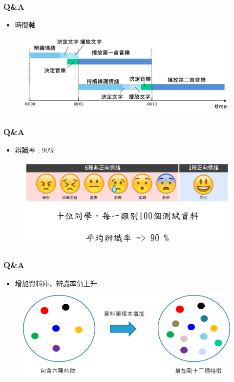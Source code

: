 \documentclass[10pt, conference, compsocconf]{beamer}
\begin{document}
\begin{CJK}{UTF8}{}
\begin{frame}
\frametitle{Q\&A}
\begin{itemize}
\item\Large 時間軸
\end{itemize}
\begin{figure}[t]
\begin{center}
\includegraphics[width=12cm]{./Figures/2.png}
\end{center}
\end{figure}
\end{frame}

\begin{frame}
\frametitle{Q\&A}
\begin{itemize}
\item\Large 辨識率 : 90\%
\end{itemize}
\begin{figure}[t]
\begin{center}
\includegraphics[width=12cm]{./Figures/QAEmotion2.pdf}
\end{center}
\end{figure}
\end{frame}

\begin{frame}
\frametitle{Q\&A}
\begin{itemize}
\item\Large 增加資料庫，辨識率仍上升
\end{itemize}
\begin{figure}[t]
\begin{center}
\includegraphics[width=12cm]{./Figures/1.png}
\end{center}
\end{figure}
\end{frame}


\end{CJK}
\end{document}
